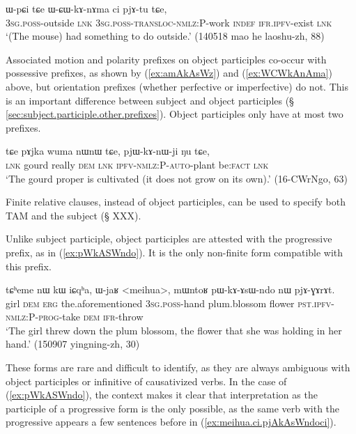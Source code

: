 \begin{exe}
\ex  \label{ex:WCWkAnAma}
\gll ɯ-pɕi tɕe ɯ-ɕɯ-kɤ-nɤma ci pjɤ-tu tɕe, \\
\textsc{3sg}.\textsc{poss}-outside \textsc{lnk} \textsc{3sg}.\textsc{poss}-\textsc{transloc}-\textsc{nmlz}:P-work \textsc{indef} \textsc{ifr}.\textsc{ipfv}-exist \textsc{lnk} \\
\glt  `(The mouse) had something to do outside.' (140518 mao he laoshu-zh, 88)
\end{exe}

Associated motion and polarity prefixes on object participles co-occur with possessive prefixes, as shown by  (\ref{ex:amAkAsWz}) and  (\ref{ex:WCWkAnAma})  above, but orientation prefixes (whether perfective or imperfective) do not. This is an important difference between subject and object participles (§ \ref{sec:subject.participle.other.prefixes}). Object participles only have at most two prefixes.

\begin{exe}
\ex  \label{ex:pjWKAnWji}
\gll tɕe pɤjka wuma nɯnɯ tɕe, pjɯ-kɤ-nɯ-ji ŋu tɕe, \\
\textsc{lnk} gourd really \textsc{dem} \textsc{lnk} \textsc{ipfv}-\textsc{nmlz}:P-\textsc{auto}-plant be:\textsc{fact} \textsc{lnk} \\
\glt `The gourd proper is cultivated (it does not grow on its own).' (16-CWrNgo, 63)
\end{exe}

Finite relative clauses, instead of object participles, can be used to specify both TAM and the subject (§ XXX).

Unlike subject participle, object participles are attested with the progressive  prefix, as in (\ref{ex:pWkASWndo}). It is the only non-finite form compatible with this prefix.  

\begin{exe}
\ex  \label{ex:pWkASWndo}
\gll  tɕʰeme nɯ kɯ iɕqʰa, ɯ-jaʁ <meihua>, mɯntoʁ pɯ-kɤ-ɤsɯ-ndo nɯ pjɤ-ɣɤrɤt.  \\
girl \textsc{dem} \textsc{erg} the.aforementioned \textsc{3sg}.\textsc{poss}-hand plum.blossom flower \textsc{pst}.\textsc{ipfv}-\textsc{nmlz}:P-\textsc{prog}-take \textsc{dem} \textsc{ifr}-throw \\
\glt `The girl threw down the plum blossom, the flower that she was holding in her hand.' (150907 yingning-zh, 30)
\end{exe}

These forms are rare and difficult to identify, as they are always ambiguous with object participles or infinitive of causativized verbs. In the case of (\ref{ex:pWkASWndo}), the context makes it clear that interpretation as the participle of a progressive form is the only possible, as the same verb with the progressive appears a few sentences before in (\ref{ex:meihua.ci.pjAkAsWndoci}).

